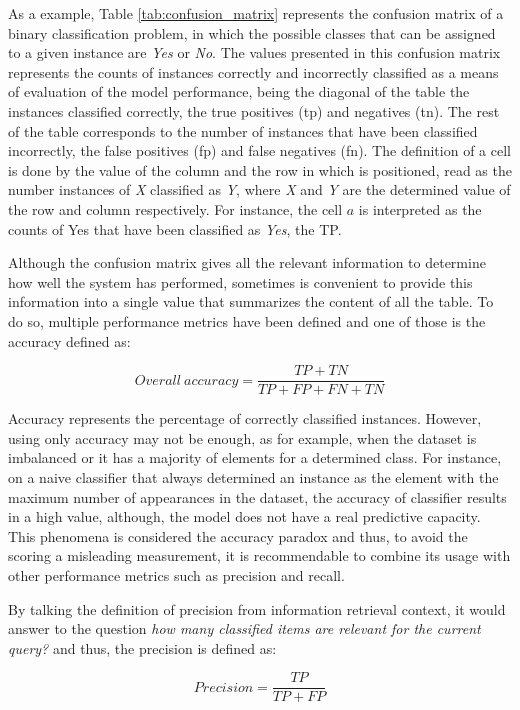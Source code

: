 As a example, Table \ref{tab:confusion_matrix} represents the confusion matrix of a binary classification problem, in which the possible classes that can be assigned to a given instance are \textit{Yes} or \textit{No}. The values presented in this confusion matrix represents the counts of instances correctly and incorrectly classified as a means of evaluation of the model performance, being the diagonal of the table the instances classified correctly, the true positives (\acrshort{tp}) and negatives (\acrshort{tn}). The rest of the table corresponds to the number of instances that have been classified incorrectly, the false positives (\acrshort{fp}) and false negatives (\acrshort{fn}). The definition of a cell is done by the value of the column and the row in which is positioned, read as the number instances of \textit{X} classified as \textit{Y}, where \textit{X} and \textit{Y} are the determined value of the row and column respectively. For instance, the cell $a$ is interpreted as the counts of Yes that have been classified as \textit{Yes}, the TP.

Although the confusion matrix gives all the relevant information to determine how well the system has performed, sometimes is convenient to provide this information into a single value that summarizes the content of all the table. To do so, multiple performance metrics have been defined and one of those is the accuracy defined as:

\[Overall\ accuracy=\frac{TP+TN}{TP+FP+FN+TN}\]

Accuracy represents the percentage of correctly classified instances. However, using only accuracy may not be enough, as for example, when the dataset is imbalanced or it has a majority of elements for a determined class. For instance, on a naive classifier that always determined an instance as the element with the maximum number of appearances in the dataset, the accuracy of classifier results in a high value, although, the model does not have a real predictive capacity. This phenomena is considered the accuracy paradox \cite{accuracyParadox} and thus, to avoid the scoring a misleading measurement, it is recommendable to combine its usage with other performance metrics such as precision and recall.

By talking the definition of precision from information retrieval context, it would answer to the question \textit{how many classified items are relevant for the current query?} and thus, the precision is defined as:

\[Precision=\frac{TP}{TP+FP}\]


